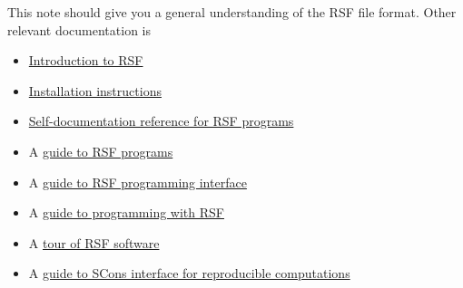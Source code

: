 This note should give you a general understanding of the RSF file
format. Other relevant documentation is 
\begin{itemize}
\item
  \href{http://egl.beg.utexas.edu/RSF/book/rsf/rsf/paper_html/}{Introduction
  to RSF}
\item
  \href{http://egl.beg.utexas.edu/RSF/book/rsf/rsf/install_html/}{Installation instructions}
\item \href{http://egl.beg.utexas.edu/RSF/}{Self-documentation reference for RSF programs}
\item A \href{http://egl.beg.utexas.edu/RSF/book/rsf/rsf/prog_html/}{guide to RSF programs}
\item A \href{http://egl.beg.utexas.edu/RSF/book/rsf/rsf/api_html/}{guide to
    RSF programming interface}
\item A \href{http://egl.beg.utexas.edu/RSF/book/rsf/rsf/demo_html/}{guide to programming with RSF}
\item A \href{http://egl.beg.utexas.edu/RSF/book/rsf/rsf/tour_html/}{tour of RSF software}
\item A
  \href{http://egl.beg.utexas.edu/RSF/book/rsf/scons/paper_html/}{guide
    to SCons interface for reproducible computations}
\end{itemize}




